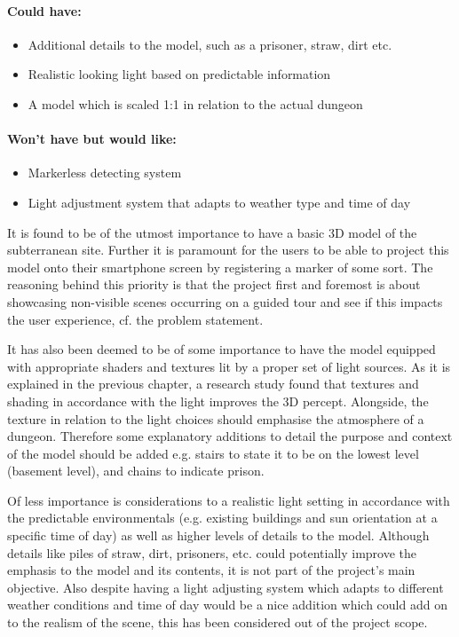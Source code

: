 \paragraph{Could have:}
\begin{itemize}
\item Additional details to the model, such as a prisoner, straw, dirt etc.
\item Realistic looking light based on predictable information
\item A model which is scaled 1:1 in relation to the actual dungeon
\end{itemize}

\paragraph{Won’t have but would like:}
\begin{itemize}
\item Markerless detecting system
\item Light adjustment system that adapts to weather type and time of day
\end{itemize}

It is found to be of the utmost importance to have a basic 3D model of the subterranean site. Further it is paramount for the users to be able to project this model onto their smartphone screen by registering a marker of some sort. The reasoning behind this priority is that the project first and foremost is about showcasing non-visible scenes occurring on a guided tour and see if this impacts the user experience, cf. the problem statement. 

It has also been deemed to be of some importance to have the model equipped with appropriate shaders and textures lit by a proper set of light sources. As it is explained in the previous chapter, a research study found that textures and shading in accordance with the light improves the 3D percept. Alongside, the texture in relation to the light choices should emphasise the atmosphere of a dungeon. Therefore some explanatory additions to detail the purpose and context of the model should be added e.g. stairs to state it to be on the lowest level (basement level), and chains to indicate prison. 

Of less importance is considerations to a realistic light setting in accordance with the predictable environmentals (e.g. existing buildings and sun orientation at a specific time of day) as well as higher levels of details to the model. Although details like piles of straw, dirt, prisoners, etc. could potentially improve the emphasis to the model and its contents, it is not part of the project’s main objective. Also despite having a light adjusting system which adapts to different weather conditions and time of day would be a nice addition which could add on to the realism of the scene, this has been considered out of the project scope. 

